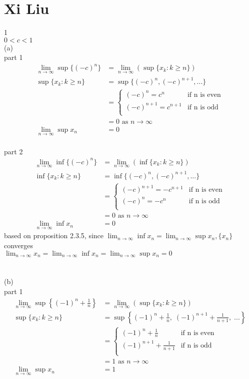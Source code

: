 \documentclass[12pt, border = 4pt, multi]{article} %
\begin{document}
\section*{Xi Liu}
1\\
$0 < c < 1$\\
(a)\\
part 1
\begin{align*}
\lim_{n \rightarrow \infty} \sup \{(-c) ^ n\} &= \lim_{n \rightarrow \infty}(\sup\{x_k: k \geq n\})\\
\sup\{x_k: k \geq n\} &= \sup\{(-c) ^ n, (-c) ^ {n + 1}, ...\}\\
&=
\begin{cases}
(-c) ^ n = c ^ n & \text{if n is even}\\
(-c) ^ {n + 1} = c ^ {n + 1} & \text{if n is odd}\\
\end{cases}\\
&= 0 \text{ as } n \rightarrow \infty\\
\lim_{n \rightarrow \infty} \sup x_n &= 0
\end{align*}
\\
part 2
\begin{align*}
\lim_{n \rightarrow \infty} \inf \{(-c) ^ n\} &= \lim_{n \rightarrow \infty}(\inf\{x_k: k \geq n\})\\
\inf\{x_k: k \geq n\} &= \inf\{(-c) ^ n, (-c) ^ {n + 1}, ...\}\\
&=
\begin{cases}
(-c) ^ {n + 1} = -c ^ {n + 1} & \text{if n is even}\\
(-c) ^ n = -c ^ n & \text{if n is odd}\\
\end{cases}\\
&= 0 \text{ as } n \rightarrow \infty\\
\lim_{n \rightarrow \infty} \inf x_n &= 0
\end{align*}
based on proposition 2.3.5, since $\lim_{n \rightarrow \infty} \inf x_n = \lim_{n \rightarrow \infty} \sup x_n, \{x_n\}$ converges\\
$\lim_{n \rightarrow \infty} x_n = \lim_{n \rightarrow \infty} \inf x_n = \lim_{n \rightarrow \infty} \sup x_n = 0$\\
\\
\\
(b)\\
part 1
\begin{align*}
\lim_{n \rightarrow \infty} \sup\left\{(-1) ^ n + \frac{1}{n}\right\} &= \lim_{n \rightarrow \infty}(\sup\{x_k: k \geq n\})\\
\sup\{x_k: k \geq n\} &= \sup\left\{(-1) ^ n + \frac{1}{n},\;(-1) ^ {n + 1} + \frac{1}{n + 1},\;...\right\}\\
&=
\begin{cases}
(-1) ^ n + \frac{1}{n} & \text{if n is even}\\
(-1) ^ {n + 1} + \frac{1}{n + 1} & \text{if n is odd}\\
\end{cases}\\
&= 1 \text{ as } n \rightarrow \infty\\
\lim_{n \rightarrow \infty} \sup x_n &= 1
\end{align*}
\end{document}
